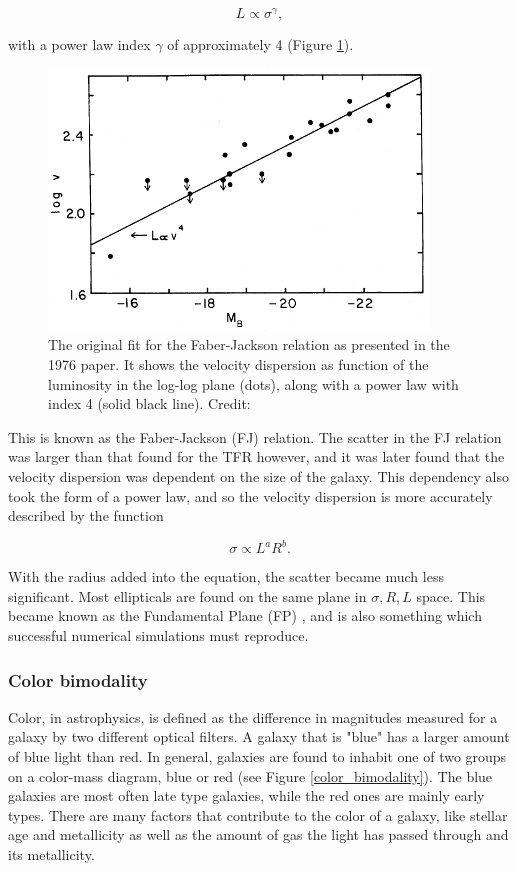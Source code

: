 \begin{equation}
    L \propto \sigma^{\gamma},
\end{equation}

with a power law index $\gamma$ of approximately 4 (Figure \ref{faber_jackson}).

\begin{figure}
    \centering
    \includegraphics[width=0.9\textwidth]{images/faber_jackson.png}
    \caption{The original fit for the Faber-Jackson relation as presented in the 1976 paper. It shows the velocity dispersion as function of the luminosity in the log-log plane (dots), along with a power law with index 4 (solid black line). Credit: \parencite{TullyFisher1977}}
    \label{faber_jackson}
\end{figure}

This is known as the Faber-Jackson (FJ) relation. The scatter in the FJ relation was larger than that found for the TFR however, and it was later found that the velocity dispersion was dependent on the size of the galaxy. This dependency also took the form of a power law, and so the velocity dispersion is more accurately described by the function

\begin{equation}
    \sigma \propto L^a R^b.
\end{equation}

With the radius added into the equation, the scatter became much less significant. Most ellipticals are found on the same plane in ${\sigma, R, L}$ space. This became known as the Fundamental Plane (FP) \parencite{Djorgovski1987}, and is also something which successful numerical simulations must reproduce.

\subsubsection{Color bimodality}
Color, in astrophysics, is defined as the difference in magnitudes measured for a galaxy by two different optical filters. A galaxy that is "blue" has a larger amount of blue light than red. In general, galaxies are found to inhabit one of two groups on a color-mass diagram, blue or red (see Figure \ref{color_bimodality}). The blue galaxies are most often late type galaxies, while the red ones are mainly early types. There are many factors that contribute to the color of a galaxy, like stellar age and metallicity as well as the amount of gas the light has passed through and its metallicity.

